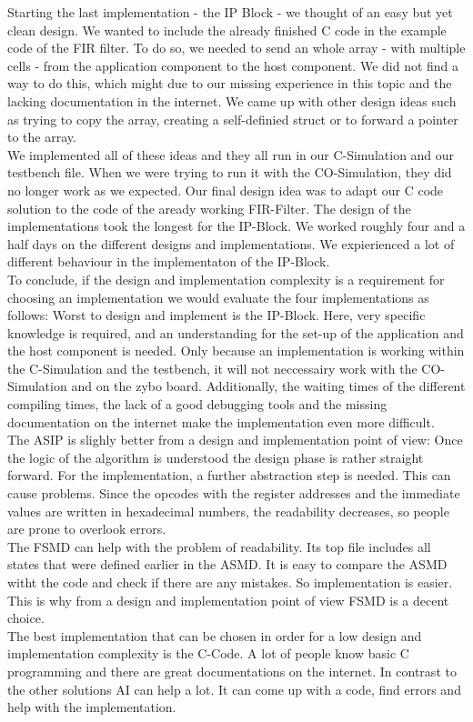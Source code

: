 \documentclass[conference]{IEEEtran}
\begin{document}
Starting the last implementation - the IP Block - we thought of an easy but yet clean design. We wanted to include the already finished C code in the example code of the FIR filter. To do so, we needed to send an whole array - with multiple cells - from the application component to the host component. We did not find a way to do this, which might due to our missing experience in this topic and the lacking documentation in the internet. We came up with other design ideas such as trying to copy the array, creating a self-definied struct or to forward a pointer to the array.\\ 
We implemented all of these ideas and they all run in our C-Simulation and our testbench file. When we were trying to run it with the CO-Simulation, they did no longer work as we expected. Our final design idea was to adapt our C code solution to the code of the aready working FIR-Filter. The design of the implementations took the longest for the IP-Block. We worked roughly four and a half days on the different designs and implementations. We expierienced a lot of different behaviour in the implementaton of the IP-Block. \\  
To conclude, if the design and implementation complexity is a requirement for choosing an implementation we would evaluate the four implementations as follows:
Worst to design and implement is the IP-Block. Here, very specific knowledge is required, and an understanding for the set-up of the application and the host component is needed. Only because an implementation is working within the C-Simulation and the testbench, it will not neccessairy work with the CO-Simulation and on the zybo board. Additionally, the waiting times of the different compiling times, the lack of a good debugging tools and the missing documentation on the internet make the implementation even more difficult.\\
The ASIP is slighly better from a design and implementation point of view: Once the logic of the algorithm is understood the design phase is rather straight forward. For the implementation, a further abstraction step is needed. This can cause problems. Since the opcodes with the register addresses and the immediate values are written in hexadecimal numbers, the readability decreases, so people are prone to overlook errors.\\
The FSMD can help with the problem of readability. Its top file includes all states that were defined earlier in the ASMD. It is easy to compare the ASMD witht the code and check if there are any mistakes. So implementation is easier. This is why from a design and implementation point of view FSMD is a decent choice.\\
The best implementation that can be chosen in order for a low design and implementation complexity is the C-Code. A lot of people know basic C programming and there are great documentations on the internet. In contrast to the other solutions AI can help a lot. It can come up with a code, find errors and help with the implementation.\\
\end{document}
